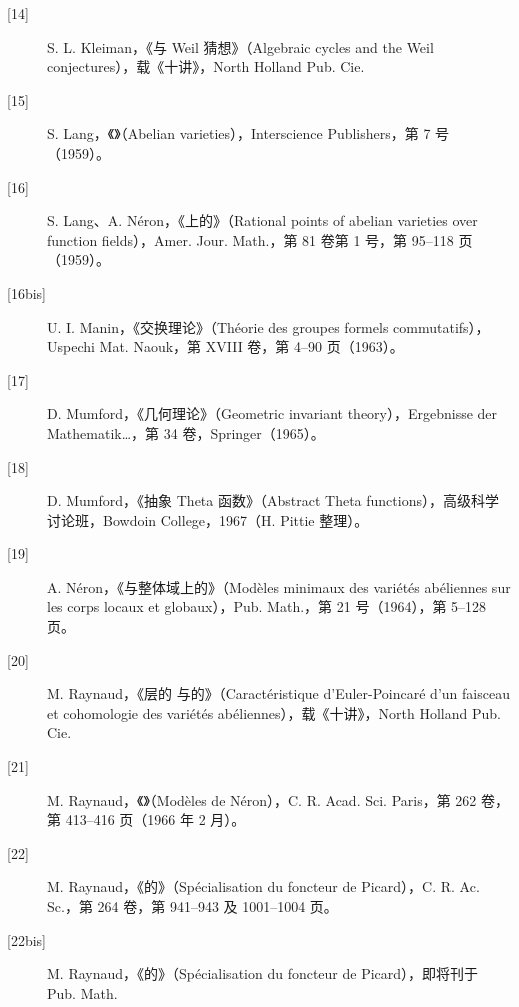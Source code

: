 \begin{description}
\item[{[14]}] S. L. Kleiman，《与 Weil 猜想》（Algebraic cycles and the Weil conjectures），载《十讲》，North Holland Pub. Cie.
\item[{[15]}] S. Lang，《》（Abelian varieties），Interscience Publishers，第 7 号（1959）。
\item[{[16]}] S. Lang、A. Néron，《上的》（Rational points of abelian varieties over function fields），Amer. Jour. Math.，第 81 卷第 1 号，第 95--118 页（1959）。
\item[{[16bis]}] U. I. Manin，《交换理论》（Théorie des groupes formels commutatifs），Uspechi Mat. Naouk，第 XVIII 卷，第 4--90 页（1963）。
\item[{[17]}] D. Mumford，《几何理论》（Geometric invariant theory），Ergebnisse der Mathematik\ldots，第 34 卷，Springer（1965）。
\item[{[18]}] D. Mumford，《抽象 Theta 函数》（Abstract Theta functions），高级科学讨论班，Bowdoin College，1967（H. Pittie 整理）。
\item[{[19]}] A. Néron，《与整体域上的》（Modèles minimaux des variétés abéliennes sur les corps locaux et globaux），Pub. Math.，第 21 号（1964），第 5--128 页。
\item[{[20]}] M. Raynaud，《层的 与的》（Caractéristique d'Euler-Poincaré d'un faisceau et cohomologie des variétés abéliennes），载《十讲》，North Holland Pub. Cie.
\item[{[21]}] M. Raynaud，《》（Modèles de Néron），C. R. Acad. Sci. Paris，第 262 卷，第 413--416 页（1966 年 2 月）。
\item[{[22]}] M. Raynaud，《的》（Spécialisation du foncteur de Picard），C. R. Ac. Sc.，第 264 卷，第 941--943 及 1001--1004 页。
\item[{[22bis]}] M. Raynaud，《的》（Spécialisation du foncteur de Picard），即将刊于 Pub. Math.
\end{description}
